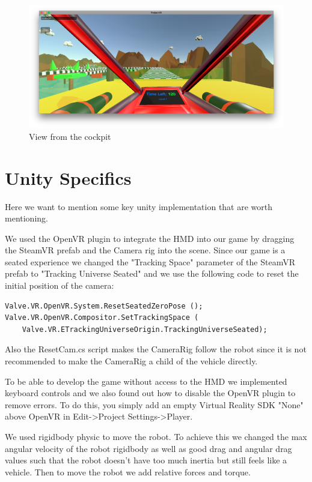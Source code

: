 \documentclass[12pt]{article}
\begin{document}
\begin{figure}[h]
   \caption{\label{étiquette} View from the cockpit}
   \includegraphics[scale=1]{images/cockpit.png}
\end{figure}

\section{Unity Specifics}

Here we want to mention some key unity implementation that are worth mentioning.

We used the OpenVR plugin to integrate the HMD into our game by dragging the SteamVR prefab and the Camera rig into the scene. Since our game is a seated experience we changed the "Tracking Space" parameter of the SteamVR prefab to "Tracking Universe Seated" and we use the following code to reset the initial position of the camera:

\begin{lstlisting}
Valve.VR.OpenVR.System.ResetSeatedZeroPose ();
Valve.VR.OpenVR.Compositor.SetTrackingSpace (
    Valve.VR.ETrackingUniverseOrigin.TrackingUniverseSeated);
\end{lstlisting}

Also the ResetCam.cs script makes the CameraRig follow the robot since it is not recommended to make the CameraRig a child of the vehicle directly.

To be able to develop the game without access to the HMD we implemented keyboard controls and we also found out how to disable the OpenVR plugin to remove errors. To do this, you simply add an empty Virtual Reality SDK "None" above OpenVR in Edit->Project Settings->Player.

We used rigidbody physic to move the robot. To achieve this we changed the max angular velocity of the robot rigidbody as well as good drag and angular drag values such that the robot doesn't have too much inertia but still feels like a vehicle. Then to move the robot we add relative forces and torque.
\end{document}
